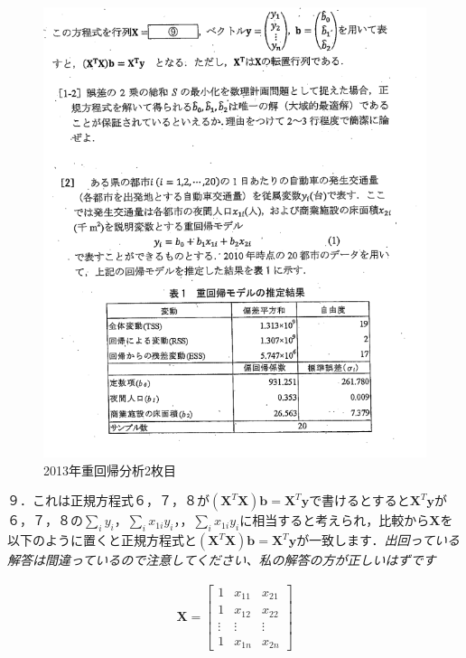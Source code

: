 \documentclass{jsarticle}
\begin{document}
\begin{figure}[htbp]
  \includegraphics[keepaspectratio, width=16cm]{figures/jyukaiki20132.png}
  \caption{2013年重回帰分析2枚目\label{jyukaiki20132}}
\end{figure}

\pagebreak

９．これは正規方程式６，７，８が$(\bm{X}^T \bm{X})\bm{b}=\bm{X}^T \bm{y}$で書けるとすると$\bm{X}^T \bm{y}$が６，７，８の$\sum_i y_i$，$\sum_i x_{1i} y_i$，，$\sum_i x_{1i} y_i$に相当すると考えられ，比較から$\bm{X}$を以下のように置くと正規方程式と$(\bm{X}^T \bm{X})\bm{b}=\bm{X}^T \bm{y}$が一致します．\emph{出回っている解答は間違っているので注意してください、私の解答の方が正しいはずです}

\begin{align*}
\bm{X}=\begin{bmatrix}
1 & x_{11} & x_{21}\\
1 & x_{12} & x_{22}\\
\vdots & \vdots & \vdots \\
1 & x_{1n} & x_{2n}
\end{bmatrix}
\end{align*}
\end{document}
